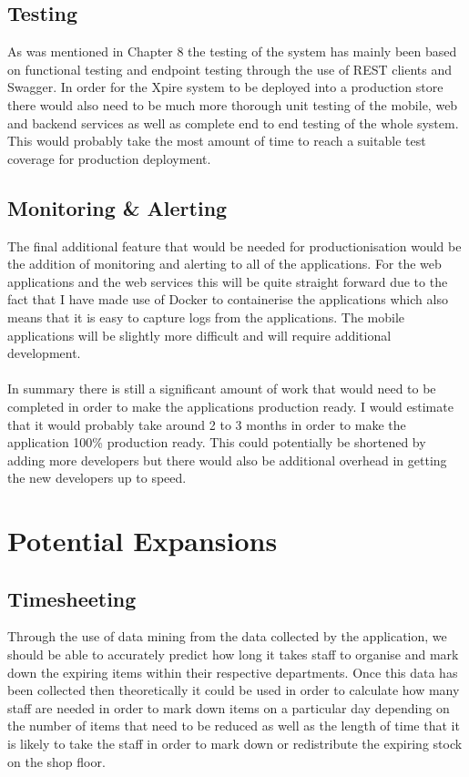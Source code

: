 \documentclass[a4paper,11pt]{report}
\begin{document}
\subsection{Testing}
As was mentioned in Chapter 8 the testing of the system has mainly been based on functional testing and endpoint testing through the use of REST clients and Swagger. In order for the Xpire system to be deployed into a production store there would also need to be much more thorough unit testing of the mobile, web and backend services as well as complete end to end testing of the whole system. This would probably take the most amount of time to reach a suitable test coverage for production deployment.

\subsection{Monitoring \& Alerting}
The final additional feature that would be needed for productionisation would be the addition of monitoring and alerting to all of the applications. For the web applications and the web services this will be quite straight forward due to the fact that I have made use of Docker to containerise the applications which also means that it is easy to capture logs from the applications. The mobile applications will be slightly more difficult and will require additional development.
\\
\\
In summary there is still a significant amount of work that would need to be completed in order to make the applications production ready. I would estimate that it would probably take around 2 to 3 months in order to make the application 100\% production ready. This could potentially be shortened by adding more developers but there would also be additional overhead in getting the new developers up to speed.


\section{Potential Expansions}

\subsection{Timesheeting}
Through the use of data mining from the data collected by the application, we should be able to accurately predict
how long it takes staff to organise and mark down the expiring items within their respective departments. Once 
this data has been collected then theoretically it could be used in order to calculate how many staff are needed 
in order to mark down items on a particular day depending on the number of items that need to be reduced as well 
as the length of time that it is likely to take the staff in order to mark down or redistribute the expiring stock
on the shop floor. 
\end{document}
